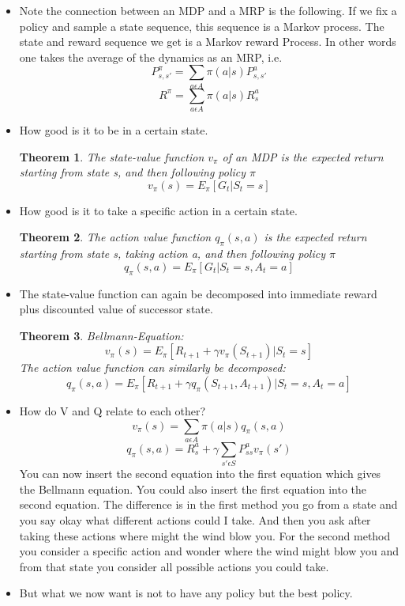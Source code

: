 \documentclass[a4paper]{article}
\newtheorem{theorem}{Theorem}
\begin{document}
\begin{itemize}
    \item Note the connection between an MDP and a MRP is the following. If we fix a policy and sample a state sequence, this sequence is a Markov process. The state and reward sequence we get is a Markov reward Process. In other words one takes the average of the dynamics as an MRP, i.e. 
    $$ P_{s,s'}^{\pi} = \sum_{a\epsilon A} \pi(a|s)P_{s,s'}^a$$
    $$R^{\pi}= \sum_{a\epsilon A} \pi(a|s)R_{s}^a$$
    \item How good is it to be in a certain state. 
    \begin{theorem}
    The state-value function $v_{\pi}$ of an MDP is the expected return starting from state s, and then following policy $\pi$ $$ v_{\pi}(s) = E_{\pi}[G_t |S_t=s]$$
    \end{theorem}
    \item How good is it to take a specific action in a certain state. 
    \begin{theorem}
    The action value function $q_{\pi}(s,a)$ is the expected return starting from state s, taking action a, and then following policy $\pi$ 
    $$q_{\pi}(s,a)= E_{\pi}[G_t | S_t = s, A_t = a]$$
    \end{theorem} 
    \item The state-value function can again be decomposed into immediate reward plus discounted value of successor state. 
    \begin{theorem}
    Bellmann-Equation: $$v_{\pi}(s) = E_{\pi}[R_{t+1} + \gamma v_{\pi}(S_{t+1}) | S_t = s]$$
    The action value function can similarly be decomposed: 
    $$q_{\pi}(s,a) = E_{\pi}[R_{t+1} + \gamma q_{\pi}(S_{t+1}, A_{t+1}) | S_t = s, A_t = a]$$ 
    \end{theorem}
    \item How do V and Q relate to each other? 
    $$v_{\pi}(s) = \sum_{a\epsilon A}\pi(a|s)q_{\pi}(s,a)$$ 
    $$q_{\pi}(s,a) = R_s^a + \gamma\sum_{s'\epsilon S}P_{ss}^a v_{\pi}(s')$$
    You can now insert the second equation into the first equation which gives the Bellmann equation. You could also insert the first equation into the second equation. The difference is in the first method you go from a state and you say okay what different actions could I take. And then you ask after taking these actions where might the wind blow you. For the second method you consider a specific action and wonder where the wind might blow you and from that state you consider all possible actions you could take. 
    \item But what we now want is not to have any policy but the best policy. 

\end{itemize}
\end{document}
